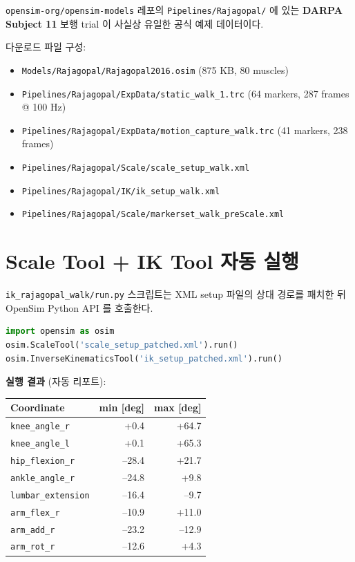 \documentclass[11pt, a4paper]{report}
\begin{document}
\begin{keyidea}
\texttt{opensim-org/opensim-models} 레포의
\texttt{Pipelines/Rajagopal/} 에 있는 \textbf{DARPA Subject 11}
보행 trial 이 사실상 유일한 공식 예제 데이터이다.
\end{keyidea}

다운로드 파일 구성:
\begin{itemize}
  \item \texttt{Models/Rajagopal/Rajagopal2016.osim} (875 KB, 80 muscles)
  \item \texttt{Pipelines/Rajagopal/ExpData/static\_walk\_1.trc} (64 markers, 287 frames @ 100 Hz)
  \item \texttt{Pipelines/Rajagopal/ExpData/motion\_capture\_walk.trc} (41 markers, 238 frames)
  \item \texttt{Pipelines/Rajagopal/Scale/scale\_setup\_walk.xml}
  \item \texttt{Pipelines/Rajagopal/IK/ik\_setup\_walk.xml}
  \item \texttt{Pipelines/Rajagopal/Scale/markerset\_walk\_preScale.xml}
\end{itemize}

\section{Scale Tool + IK Tool 자동 실행}

\texttt{ik\_rajagopal\_walk/run.py} 스크립트는 XML setup 파일의 상대
경로를 패치한 뒤 OpenSim Python API 를 호출한다.

\begin{lstlisting}[language=Python, caption={ik\_rajagopal\_walk/run.py 핵심}]
import opensim as osim
osim.ScaleTool('scale_setup_patched.xml').run()
osim.InverseKinematicsTool('ik_setup_patched.xml').run()
\end{lstlisting}

\noindent
\textbf{실행 결과} (자동 리포트):

\begin{center}
\small
\begin{tabular}{l|r|r}
\toprule
Coordinate & min [deg] & max [deg] \\
\midrule
\texttt{knee\_angle\_r} & +0.4 & +64.7 \\
\texttt{knee\_angle\_l} & +0.1 & +65.3 \\
\texttt{hip\_flexion\_r} & --28.4 & +21.7 \\
\texttt{ankle\_angle\_r} & --24.8 & +9.8 \\
\texttt{lumbar\_extension} & --16.4 & --9.7 \\
\texttt{arm\_flex\_r} & --10.9 & +11.0 \\
\texttt{arm\_add\_r} & --23.2 & --12.9 \\
\texttt{arm\_rot\_r} & --12.6 & +4.3 \\
\bottomrule
\end{tabular}
\end{center}
\end{document}

